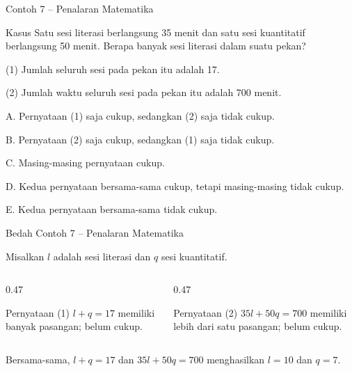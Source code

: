 \begin{frame}[shrink=12]{Contoh 7 -- Penalaran Matematika}
  \begin{block}{Kasus}
    Satu sesi literasi berlangsung 35 menit dan satu sesi kuantitatif berlangsung 50 menit. Berapa banyak sesi literasi dalam suatu pekan?
  \end{block}
  {\fontsize{10.0}{12.3}\selectfont
  (1) Jumlah seluruh sesi pada pekan itu adalah 17.\par
  (2) Jumlah waktu seluruh sesi pada pekan itu adalah 700 menit.}\par
  \vspace{0.10cm}
  {\fontsize{9.15}{11.2}\selectfont
  A. Pernyataan (1) saja cukup, sedangkan (2) saja tidak cukup.\par\vspace{0.035cm}
  B. Pernyataan (2) saja cukup, sedangkan (1) saja tidak cukup.\par\vspace{0.035cm}
  C. Masing-masing pernyataan cukup.\par\vspace{0.035cm}
  D. Kedua pernyataan bersama-sama cukup, tetapi masing-masing tidak cukup.\par\vspace{0.035cm}
  E. Kedua pernyataan bersama-sama tidak cukup.}
\end{frame}

\begin{frame}[shrink=6]{Bedah Contoh 7 -- Penalaran Matematika}
  \vspace{0.16cm}
  {\fontsize{10.5}{13.0}\selectfont Misalkan $l$ adalah sesi literasi dan $q$ sesi kuantitatif.
  \begin{columns}[T,onlytextwidth]
    \begin{column}{0.47\textwidth}
      \begin{block}{Pernyataan (1)}
        $l+q=17$ memiliki banyak pasangan; belum cukup.
      \end{block}
    \end{column}
    \begin{column}{0.47\textwidth}
      \begin{block}{Pernyataan (2)}
        $35l+50q=700$ memiliki lebih dari satu pasangan; belum cukup.
      \end{block}
    \end{column}
  \end{columns}
  Bersama-sama, $l+q=17$ dan $35l+50q=700$ menghasilkan $l=10$ dan $q=7$.\par\vspace{0.11cm}
  \par\vspace{0.11cm}
  }
\end{frame}

